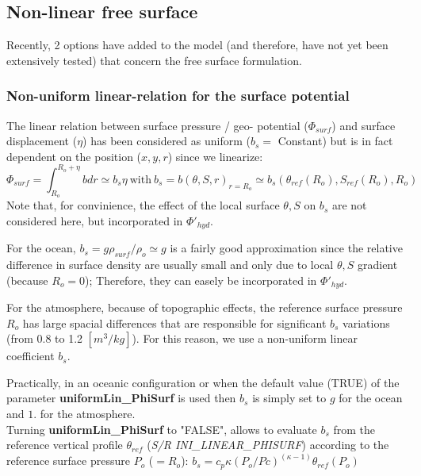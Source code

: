 

\subsection{Non-linear free surface}

Recently, 2 options have added to the model
(and therefore, have not yet been extensively tested)
that concern the free surface formulation.

\subsubsection{Non-uniform linear-relation for the surface potential}

The linear relation between 
surface pressure / geo- potential ($\Phi_{surf}$)
and surface displacement ($\eta$)
has been considered as uniform ($b_s =$ Constant)
but is in fact
dependent on the position ($x,y,r$)
since we linearize:
$$\Phi_{surf}=\int_{R_o}^{R_o+\eta} b dr \simeq b_s \eta
~\mathrm{with}~ b_s = b(\theta,S,r)_{r=R_o} 
\simeq b_s(\theta_{ref}(R_o),S_{ref}(R_o),R_o)$$
Note that, for convinience, the effect of the local 
surface $\theta,S$ on $b_s$
are not considered here, but incorporated in $\Phi'_{hyd}$.

For the ocean, $b_s = g \rho_{surf} / \rho_o \simeq g$
is a fairly good approximation since the relative difference
in surface density are usually small and only due to
local $\theta,S$ gradient (because $R_o = 0$);
Therefore, they can easely be incorporated in $\Phi'_{hyd}$.

For the atmosphere, because of topographic effects,
the reference surface pressure $R_o$ has large spacial differences
that are responsible for significant $b_s$ variations
(from 0.8 to 1.2 $[m^3/kg]$). For this reason,
we use a non-uniform linear coefficient $b_s$.

Practically, in an oceanic configuration or
when the default value (TRUE) of the parameter 
{\bf uniformLin\_PhiSurf} is used
then $b_s$ is simply set to $g$ for the ocean
and $1.$ for the atmosphere.\\
Turning {\bf uniformLin\_PhiSurf} to "FALSE", allows to
evaluate $b_s$ from the reference vertical profile $\theta_{ref}$ 
({\it S/R INI\_LINEAR\_PHISURF})
according to the reference surface pressure $P_o$ ($=R_o$):
$b_s = c_p \kappa (P_o / Pc)^{(\kappa - 1)} \theta_{ref}(P_o)$


